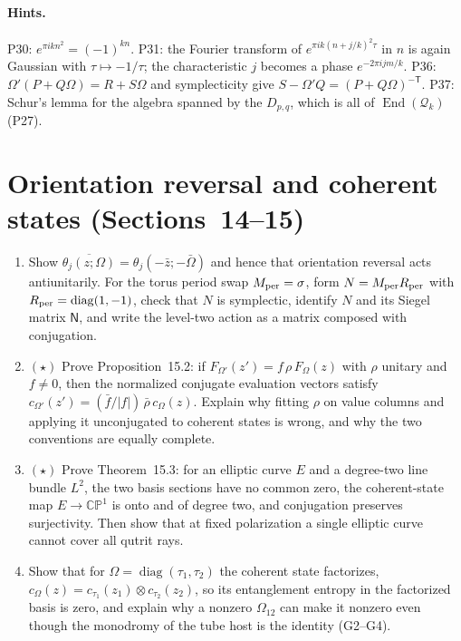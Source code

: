 \documentclass[11pt]{article}
\begin{document}
\paragraph{Hints.} P30: $e^{\pi i k n^2} = (-1)^{kn}$. P31: the Fourier transform of $e^{\pi i k(n+j/k)^2\tau}$ in $n$ is again Gaussian with
$\tau\mapsto-1/\tau$; the characteristic $j$ becomes a phase $e^{-2\pi i jm/k}$. P36: $\Omega'(P+Q\Omega) = R+S\Omega$ and symplecticity give $S-\Omega'Q = (P+Q\Omega)^{-\mathsf T}$. P37: Schur's lemma for the algebra spanned by the $D_{p,q}$, which is all of $\operatorname{End}(\mathcal Q_k)$ (P27).

\section{Orientation reversal and coherent states (Sections~14--15)}

\begin{enumerate}[label=\textbf{P\arabic*.},leftmargin=*,start=38]
\item Show $\overline{\theta_j(z;\Omega)} = \theta_j(-\bar z;-\bar\Omega)$ and
  hence that orientation reversal acts antiunitarily. For the torus period
  swap $M_{\rm per} = \sigma$, form $N = M_{\rm per}R_{\rm per}$ with
  $R_{\rm per} = \operatorname{diag}(1,-1)$, check that $N$ is symplectic,
  identify $N$ and its Siegel matrix $\mathsf N$, and write the level-two action
  as a matrix composed with conjugation.
\item $(\star)$ Prove Proposition~15.2: if $F_{\Omega'}(z') = f\,\rho\,F_\Omega(z)$ with
  $\rho$ unitary and $f\ne0$, then the normalized conjugate evaluation vectors
  satisfy $c_{\Omega'}(z') = (\bar f/|f|)\,\bar\rho\,c_\Omega(z)$. Explain why
  fitting $\rho$ on value columns and applying it unconjugated to coherent
  states is wrong, and why the two conventions are equally complete.
\item $(\star)$ Prove Theorem~15.3: for an elliptic curve $E$ and a degree-two line
  bundle $L^2$, the two basis sections have no common zero, the coherent-state
  map $E\to\mathbb{CP}^1$ is onto and of degree two, and conjugation preserves
  surjectivity. Then show that at fixed polarization a single elliptic curve
  cannot cover all qutrit rays.
\item Show that for $\Omega = \operatorname{diag}(\tau_1,\tau_2)$ the coherent
  state factorizes, $c_\Omega(z) = c_{\tau_1}(z_1)\otimes c_{\tau_2}(z_2)$, so its
  entanglement entropy in the factorized basis is zero, and explain why a
  nonzero $\Omega_{12}$ can make it nonzero even though the monodromy of the
  tube host is the identity (G2--G4).
\end{enumerate}
\end{document}
